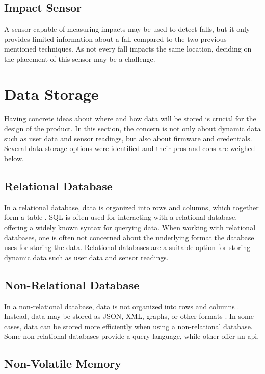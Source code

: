 \documentclass{article}
\begin{document}
\subsection{Impact Sensor}

A sensor capable of measuring impacts may be used to detect falls, but it only provides limited information about a fall compared to the two previous mentioned techniques. As not every fall impacts the same location, deciding on the placement of this sensor may be a challenge.

\section{Data Storage}

Having concrete ideas about where and how data will be stored is crucial for the design of the product.
In this section, the concern is not only about dynamic data such as user data and sensor readings, but also about firmware and credentials.
Several data storage options were identified and their pros and cons are weighed below.

\subsection{Relational Database}

In a relational database, data is organized into rows and columns, which together form a table \cite{ibm-rd}.
SQL is often used for interacting with a relational database, offering a widely known syntax for querying data.
When working with relational databases, one is often not concerned about the underlying format the database uses for storing the data.
Relational databases are a suitable option for storing dynamic data such as user data and sensor readings.

\subsection{Non-Relational Database}

In a non-relational database, data is not organized into rows and columns \cite{microsoft-nrd}.
Instead, data may be stored as JSON, XML, graphs, or other formats \cite{microsoft-nrd}.
In some cases, data can be stored more efficiently when using a non-relational database.
Some non-relational databases provide a query language, while other offer an \gls{api}.

\subsection{Non-Volatile Memory}
\end{document}
